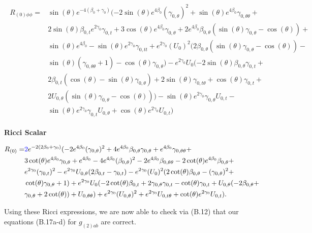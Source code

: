 \documentclass[a4paper,11pt]{article}
\numberwithin{equation}{section}
\begin{document}
\begin{subequations}
\begin{align}
\begin{split}
R_{(0) \phi \phi}=&\sin (\theta ) e^{-4 (\beta_{0}+\gamma_{0})} (-2 \sin (\theta ) e^{4 \beta_{0}} (\gamma_{0, \theta})^2+\sin (\theta ) e^{4 \beta_{0}} \gamma_{0, \theta \theta}+\\
&2 \sin (\theta ) \beta_{0, t} e^{2 \gamma_{0}} \gamma_{0, t}+3 \cos (\theta ) e^{4 \beta_{0}} \gamma_{0, \theta}+2 e^{4 \beta_{0}} \beta_{0, \theta} (\sin (\theta ) \gamma_{0, \theta}-\cos (\theta ))+\\
&\sin (\theta ) e^{4 \beta_{0}}-\sin (\theta ) e^{2 \gamma_{0}} \gamma_{0, t t}+e^{2 \gamma_{0}} (U_{0})^2 (2 \beta_{0, \theta} (\sin (\theta ) \gamma_{0, \theta}-\cos (\theta ))-\\
&\sin (\theta ) (\gamma_{0, \theta \theta}+1)-\cos (\theta ) \gamma_{0, \theta})-e^{2 \gamma_{0}} U_{0} (-2 \sin (\theta ) \beta_{0, \theta} \gamma_{0, t}+\\
&2 \beta_{0, t} (\cos (\theta )-\sin (\theta ) \gamma_{0, \theta})+2 \sin (\theta ) \gamma_{0, t \theta}+\cos (\theta ) \gamma_{0, t}+\\
&2 U_{0, \theta} (\sin (\theta ) \gamma_{0, \theta}-\cos (\theta )))-\sin (\theta ) e^{2 \gamma_{0}} \gamma_{0, \theta} U_{0, t}-\\
&\sin (\theta ) e^{2 \gamma_{0}} \gamma_{0, t} U_{0, \theta}+\cos (\theta ) e^{2 \gamma_{0}} U_{0, t})
\end{split}
\end{align}

\end{subequations}

\noindent \textbf{Ricci Scalar}

\begin{align}
\begin{split}
R_{(0)}=&\textcolor{blue}{2} e^{ -2 (2 \beta_{0}+\gamma_{0})} (-2 e^{4 \beta_{0}} (\gamma_{0, \theta})^2+4 e^{4 \beta_{0}} \beta_{0, \theta} \gamma_{0, \theta}+e^{4 \beta_{0}} \gamma_{0, \theta \theta}+\\
&3 \cot (\theta ) e^{4 \beta_{0}} \gamma_{0, \theta}+e^{4 \beta_{0}}-4 e^{4 \beta_{0}} (\beta_{0, \theta})^2-2 e^{4 \beta_{0}} \beta_{0, \theta \theta}-2 \cot (\theta ) e^{4 \beta_{0}} \beta_{0, \theta}+\\
&e^{2 \gamma_{0}} (\gamma_{0, t})^2-e^{2 \gamma_{0}} U_{0, \theta} (2 \beta_{0, t}-\gamma_{0, t})-e^{2 \gamma_{0}} (U_{0})^2 (2 \cot (\theta ) \beta_{0, \theta}-(\gamma_{0, \theta})^2+\\
&\cot (\theta ) \gamma_{0, \theta}+1)+e^{2 \gamma_{0}} U_{0} (-2 \cot (\theta ) \beta_{0, t}+2 \gamma_{0, \theta} \gamma_{0, t}-\cot (\theta ) \gamma_{0, t}+U_{0, \theta} (-2 \beta_{0, \theta}+\\
&\gamma_{0, \theta}+2 \cot (\theta ))+U_{0, \theta \theta})+e^{2 \gamma_{0}} (U_{0, \theta})^2+e^{2 \gamma_{0}} U_{0, t \theta}+\cot (\theta ) e^{2 \gamma_{0}} U_{0, t}).
\end{split}
\end{align}

\noindent Using these Ricci expressions, we are now able to check via (B.12) that our equations (B.17a-d) for $g_{(2)ab}$ are correct.  



{}

\end{document}
